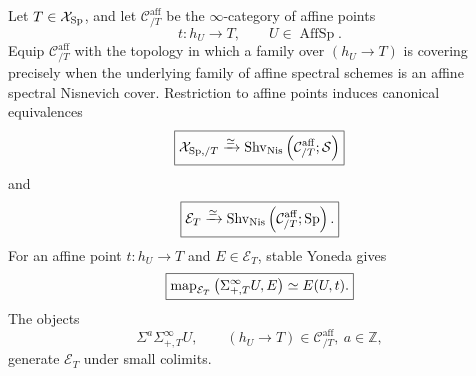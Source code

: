 \begin{theorem}
\label{thm:monadic-de-rham-affine-slice-presentation}
Let \(T\in\mathcal X_{\mathrm{Sp}}\), and let \(\mathcal C^{\mathrm{aff}}_{/T}\) be the
\(\infty\)-category of affine points
\[
    t:h_U\longrightarrow T,
    \qquad U\in\operatorname{AffSp}.
\]
Equip \(\mathcal C^{\mathrm{aff}}_{/T}\) with the topology in which a family over
\((h_U\to T)\) is covering precisely when the underlying family of affine spectral schemes is an
affine spectral Nisnevich cover.  Restriction to affine points induces canonical equivalences
\[
\boxed{
    \mathcal X_{\mathrm{Sp},/T}
    \xrightarrow{\simeq}
    \operatorname{Shv}_{\mathrm{Nis}}
    \left(
        \mathcal C^{\mathrm{aff}}_{/T};\mathcal S
    \right)
}
\]
and
\[
\boxed{
    \mathcal E_T
    \xrightarrow{\simeq}
    \operatorname{Shv}_{\mathrm{Nis}}
    \left(
        \mathcal C^{\mathrm{aff}}_{/T};\mathrm{Sp}
    \right).
}
\]
For an affine point \(t:h_U\to T\) and \(E\in\mathcal E_T\), stable Yoneda gives
\[
\boxed{
    \operatorname{map}_{\mathcal E_T}
    \left(
        \Sigma^\infty_{+,T}U,E
    \right)
    \simeq
    E(U,t).
}
\]
The objects
\[
    \Sigma^a\Sigma^\infty_{+,T}U,
    \qquad
    (h_U\to T)\in\mathcal C^{\mathrm{aff}}_{/T},\ a\in\mathbb Z,
\]
generate \(\mathcal E_T\) under small colimits.
\end{theorem}


